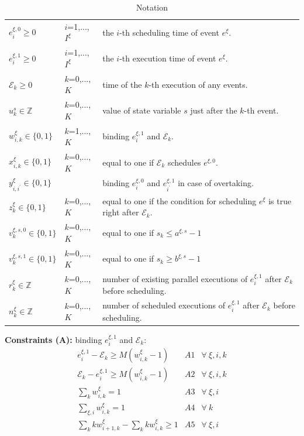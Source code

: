 \documentclass[]{interact}
\theoremstyle{plain}%
\theoremstyle{definition}
\theoremstyle{remark}
\begin{document}
\begin{table}[h]
	\begin{tabular}{lll}
		$e^{\xi,0}_{i}\ge 0$ & $i$=1,...,$I^{\xi}$& the $i$-th scheduling time of event $e^{\xi}$.\\
		$e^{\xi,1}_{i}\ge 0$ & $i$=1,...,$I^{\xi}$& the $i$-th execution time of event $e^{\xi}$.\\
		$\mathcal{E}_k\ge 0$ &$k$=0,...,$K$& time of the $k$-th execution of any events.\\
		$u^s_k\in \mathbb{Z}$ &$k$=0,...,$K$& value of state variable $s$ just after the $k$-th event.\\
		$w^{\xi}_{i,k}\in \{0,1\}$ &$k$=1,...,$K$& binding $e^{\xi,1}_i$ and $\mathcal{E}_k$.\\
		$x^{\xi}_{i,k}\in\{0,1\}$ &$k$=0,...,$K$& equal to one if $\mathcal{E}_k$ schedules $e^{\xi,0}$.\\
		$y^{\xi}_{i,i^{'}}\in\{0,1\}$&& binding $e^{\xi,0}_i$ and $e^{\xi,1}_{i^{'}}$ in case of overtaking.\\
		$z^{\xi}_{k}\in\{0,1\}$ &$k$=0,...,$K$& equal to one if the condition for scheduling $e^{\xi}$ is true right after $\mathcal{E}_k$.\\ 
		$v^{\xi,s,0}_k\in\{0,1\}$ &$k$=0,...,$K$& equal to one if $s_k\le a^{\xi,s}-1$\\
		$v^{\xi,s,1}_k\in\{0,1\}$ &$k$=0,...,$K$& equal to one if $s_k\ge b^{\xi,s}-1$\\
		$r^{\xi}_k\in \mathbb{Z}$ &$k$=0,...,$K$& number of existing parallel executions of $e^{\xi,1}_i$ after $\mathcal{E}_k$ before scheduling.\\
		$n^{\xi}_k\in \mathbb{Z}$ & $k$=0,...,$K$ & number of scheduled executions of $e^{\xi,1}_i$ after $\mathcal{E}_k$ before scheduling.\\
	\end{tabular}
\caption{Notation}
\end{table}

\textbf{Constraints (A):} binding $e^{\xi,1}_i$ and $\mathcal{E}_k$:
\begin{eqnarray}
	e^{\xi,1}_i-\mathcal{E}_k\ge M(w^{\xi}_{i,k}-1) &A1& \forall\ \xi,i,k\\
	\mathcal{E}_k-e^{\xi,1}_i\ge M(w^{\xi}_{i,k}-1) &A2& \forall\ \xi,i,k\\
	\sum_{k} w^{\xi}_{i,k} =1&A3& \forall\ \xi,i\\
	\sum_{\xi,i} w^{\xi}_{i,k} =1&A4& \forall\ k\\
	\sum_{k} kw^{\xi}_{i+1,k} - \sum_{k} kw^{\xi}_{i,k} \ge 1&A5& \forall\ \xi,i
\end{eqnarray}
\end{document}
